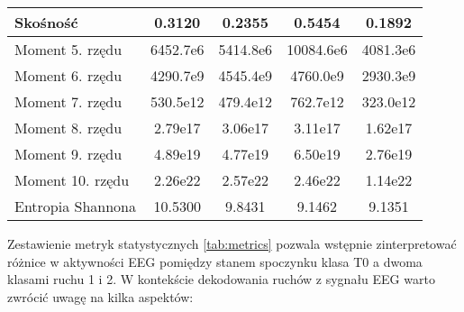 \documentclass[eeg_v4.tex]{subfiles}
\begin{document}
\begin{table}[h]
\begin{tabular}{|l|c|c|c|c|}
            \hline
            Skośność                       & 0.3120   & 0.2355   & 0.5454    & 0.1892   \\
            \hline
            Moment 5. rzędu                & 6452.7e6 & 5414.8e6 & 10084.6e6 & 4081.3e6 \\
            \hline
            Moment 6. rzędu                & 4290.7e9 & 4545.4e9 & 4760.0e9  & 2930.3e9 \\
            \hline
            Moment 7. rzędu                & 530.5e12 & 479.4e12 & 762.7e12  & 323.0e12 \\
            \hline
            Moment 8. rzędu                & 2.79e17  & 3.06e17  & 3.11e17   & 1.62e17  \\
            \hline
            Moment 9. rzędu                & 4.89e19  & 4.77e19  & 6.50e19   & 2.76e19  \\
            \hline
            Moment 10. rzędu               & 2.26e22  & 2.57e22  & 2.46e22   & 1.14e22  \\
            \hline
            Entropia Shannona              & 10.5300  & 9.8431   & 9.1462    & 9.1351   \\
            \hline
        \end{tabular}
    \end{table}


    Zestawienie metryk statystycznych \ref{tab:metrics}
    pozwala wstępnie zinterpretować różnice w aktywności EEG pomiędzy stanem
    spoczynku klasa T0 a dwoma klasami ruchu 1 i 2. W kontekście dekodowania ruchów z sygnału EEG warto zwrócić uwagę
    na kilka aspektów:
\end{document}
